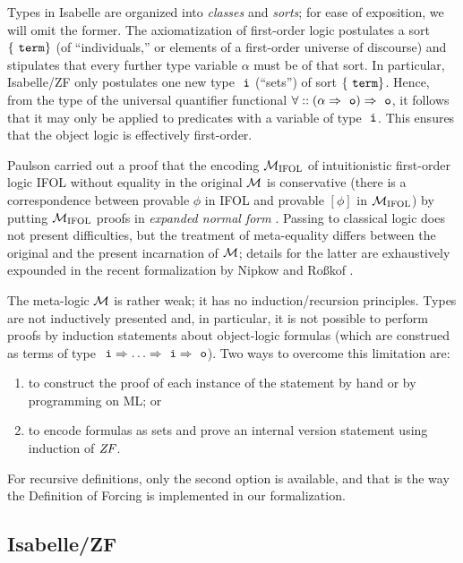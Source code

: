 Types in Isabelle are organized into \emph{classes} and \emph{sorts};
for ease of exposition, we will omit the former.  The axiomatization
of first-order logic postulates a sort $\{\type{term}\}$ (of
“individuals,” or elements of a first-order universe of discourse) and
stipulates that every further type variable $\alpha$ must be of that
sort. In particular, Isabelle/ZF only postulates one new type $\tyi$
(“sets”) of sort $\{\type{term}\}$. Hence, from the type of the universal
quantifier functional $\forall :: (\alpha \fun \tyo) \fun \tyo$, it
follows that it may only be applied to predicates with a variable of
type $\tyi$. This ensures that the object logic is effectively
first-order.

Paulson  \cite{Paulson1989} carried out a proof that the encoding
$\mathcal{M}_{\mathrm{IFOL}}$ of
intuitionistic first-order logic IFOL without equality  in the original $\mathcal{M}$ is
conservative (there is a correspondence between provable $\phi$ in
IFOL and provable $[\phi]$ in $\mathcal{M}_{\mathrm{IFOL}}$) by putting
$\mathcal{M}_{\mathrm{IFOL}}$ proofs in \emph{expanded normal form}
\cite{MR0387024}. Passing to classical logic does not present
difficulties, but the treatment of meta-equality differs between the
original and the present incarnation of $\mathcal{M}$; details for the
latter are exhaustively expounded in the recent formalization by
Nipkow and Roßkof \cite{10.1007/978-3-030-79876-5_6}.

The meta-logic $\mathcal{M}$ is rather weak; it has no induction/recursion
principles. Types are not inductively presented and, in particular, it
is not possible to perform proofs by induction statements about
object-logic formulas (which are construed as terms of type $\tyi \fun
\dots \fun \tyi \fun \tyo$). Two ways to overcome this limitation are:
\begin{enumerate}
\item
  to construct the
  proof of each instance of the statement by hand or by programming on
  ML; or 
\item
  to encode formulas as sets and prove an internal version statement
  using induction of $\mathit{ZF}$.
\end{enumerate}

For recursive definitions, only the second option is available, and
that is the way the Definition of Forcing is implemented in our
formalization.

\subsection{Isabelle/ZF}
\label{sec:isabellezf}

